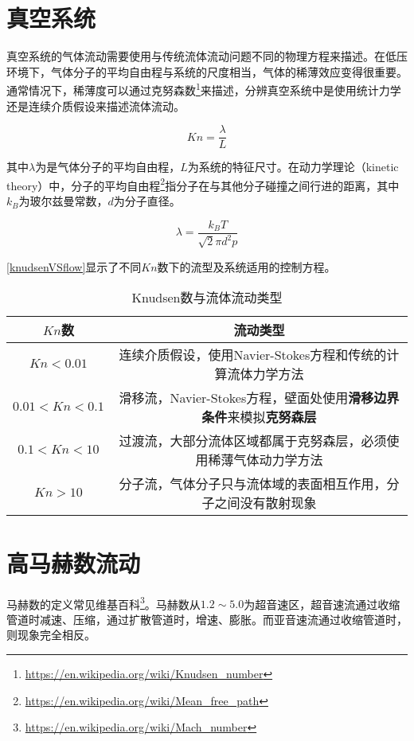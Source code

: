 \section{真空系统}
真空系统的气体流动需要使用与传统流体流动问题不同的物理方程来描述。在低压环境下，气体分子的平均自由程与系统的尺度相当，气体的稀薄效应变得很重要。通常情况下，稀薄度可以通过克努森数\footnote{\url{https://en.wikipedia.org/wiki/Knudsen_number}}来描述，分辨真空系统中是使用统计力学还是连续介质假设来描述流体流动。

\begin{equation}\label{Knudsen}
Kn = \frac{\lambda}{L}
\end{equation}

其中$ \lambda $为是气体分子的平均自由程，$ L $为系统的特征尺寸。在动力学理论（kinetic theory）中，分子的平均自由程\footnote{\url{https://en.wikipedia.org/wiki/Mean_free_path}}指分子在与其他分子碰撞之间行进的距离，其中$ k_B $为玻尔兹曼常数，$ d $为分子直径。

\begin{equation}
\lambda = \frac{k_B T}{\sqrt{2}\pi d^2 p}
\end{equation}

\autoref{knudsenVSflow}显示了不同$ Kn $数下的流型及系统适用的控制方程。

\begin{table}[h]
    \centering
    \caption{Knudsen数与流体流动类型}
    \label{knudsenVSflow}
    \begin{tabular}{cc}
        \toprule
        $ Kn $数 & 流动类型 \\
        \midrule
        $ Kn<0.01 $ & 连续介质假设，使用Navier-Stokes方程和传统的计算流体力学方法 \\
        $ 0.01<Kn<0.1 $ & 滑移流，Navier-Stokes方程，壁面处使用\textbf{滑移边界条件}来模拟\textbf{克努森层} \\
        $ 0.1<Kn<10 $ & 过渡流，大部分流体区域都属于克努森层，必须使用稀薄气体动力学方法 \\
        $ Kn>10 $ & 分子流，气体分子只与流体域的表面相互作用，分子之间没有散射现象 \\
        \bottomrule
    \end{tabular}
\end{table}

\section{高马赫数流动}
马赫数的定义常见维基百科\footnote{\url{https://en.wikipedia.org/wiki/Mach_number}}。马赫数从$ 1.2\sim5.0 $为超音速区，超音速流通过收缩管道时减速、压缩，通过扩散管道时，增速、膨胀。而亚音速流通过收缩管道时，则现象完全相反。


